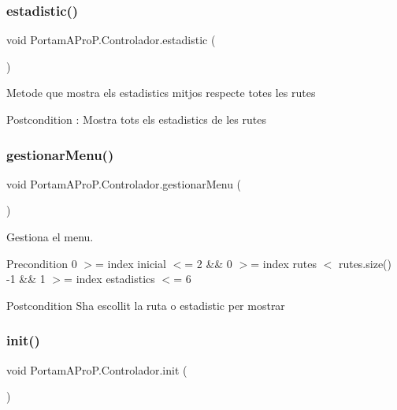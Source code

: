 \subsubsection{\texorpdfstring{estadistic()}{estadistic()}}
{\footnotesize\ttfamily void Portam\+A\+Pro\+P.\+Controlador.\+estadistic (\begin{DoxyParamCaption}{ }\end{DoxyParamCaption})}

Metode que mostra els estadistics mitjos respecte totes les rutes \begin{DoxyPostcond}{Postcondition}
\+: Mostra tots els estadistics de les rutes 
\end{DoxyPostcond}
\mbox{\label{class_portam_a_pro_p_1_1_controlador_af20b7a4354e0a4d5223bbbe04aff97e1}} 
\subsubsection{\texorpdfstring{gestionar\+Menu()}{gestionarMenu()}}
{\footnotesize\ttfamily void Portam\+A\+Pro\+P.\+Controlador.\+gestionar\+Menu (\begin{DoxyParamCaption}{ }\end{DoxyParamCaption})}



Gestiona el menu. 

\begin{DoxyPrecond}{Precondition}
0 $>$= index inicial $<$= 2 \&\& 0 $>$= index rutes $<$ rutes.\+size() -\/1 \&\& 1 $>$= index estadistics $<$= 6 
\end{DoxyPrecond}
\begin{DoxyPostcond}{Postcondition}
S\textquotesingle{}ha escollit la ruta o estadistic per mostrar 
\end{DoxyPostcond}
\mbox{\label{class_portam_a_pro_p_1_1_controlador_a60a7be623d88c96db3e8382c4779b23a}} 
\subsubsection{\texorpdfstring{init()}{init()}}
{\footnotesize\ttfamily void Portam\+A\+Pro\+P.\+Controlador.\+init (\begin{DoxyParamCaption}{ }\end{DoxyParamCaption})}



